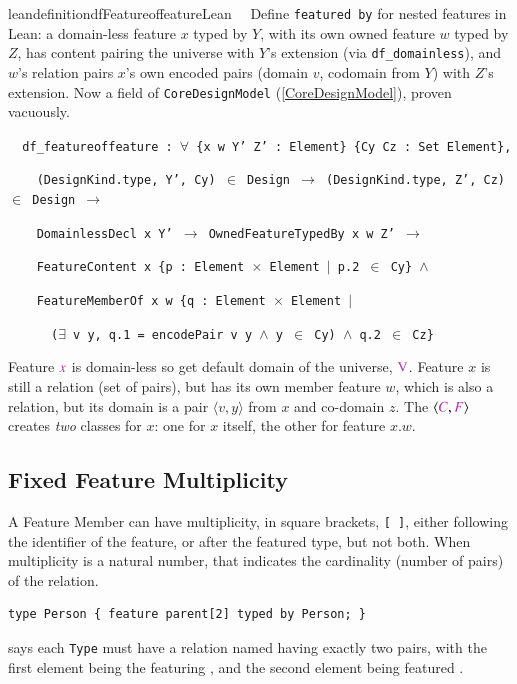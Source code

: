 \begin{restatable}{leandefinition}{dfFeatureoffeatureLean}~~ Define \texttt{featured
by} for nested features in Lean: a domain-less feature $x$ typed by $Y$, with its own owned feature $w$ typed
by $Z$, has content pairing the universe with $Y$'s extension (via \texttt{df\_domainless}), and $w$'s
relation pairs $x$'s own encoded pairs (domain $v$, codomain from $Y$) with $Z$'s extension. Now a field of
\texttt{CoreDesignModel} (\ref{CoreDesignModel}), proven vacuously.

\texttt{~~df\_featureoffeature : $\forall$ \{x w Y' Z' : Element\} \{Cy Cz : Set Element\},}

\texttt{~~~~(DesignKind.type, Y', Cy) $\in$ Design $\to$ (DesignKind.type, Z', Cz) $\in$ Design $\to$}

\texttt{~~~~DomainlessDecl x Y' $\to$ OwnedFeatureTypedBy x w Z' $\to$}

\texttt{~~~~FeatureContent x \{p : Element $\times$ Element $\vert$ p.2 $\in$ Cy\} $\wedge$}

\texttt{~~~~FeatureMemberOf x w \{q : Element $\times$ Element $\vert$}

\texttt{~~~~~~($\exists$ v y, q.1 = encodePair v y $\wedge$ y $\in$ Cy) $\wedge$ q.2 $\in$ Cz\}}
\label{df_featureoffeature}
\end{restatable}

\pn Feature $\mc{x}$ is domain-less so get default domain of the universe, $\mc{\mathrm{V}}$.  Feature $x$ is still a relation (set of pairs), but has its own member feature $w$, which is also a relation, but its domain is a pair $\langle v,y\rangle$ from $x$ and co-domain $z$.
The $\langle \mc{C},\mc{F}\rangle$ creates \emph{two} classes for $x$: one for $x$ itself, the other for feature $x.w$.

\subsection{Fixed Feature Multiplicity}  

\pn A Feature Member can have multiplicity, in square brackets, \texttt{[ ]}, either following the identifier of the feature, or after the featured type, but not both.
When multiplicity is a natural number, that indicates the cardinality (number of pairs) of the relation.

\begin{lstlisting}
type Person { feature parent[2] typed by Person; }
\end{lstlisting}
says each  \texttt{Type} must have a relation named  having exactly two pairs, with the first element being the featuring , and the second element being  featured .  

